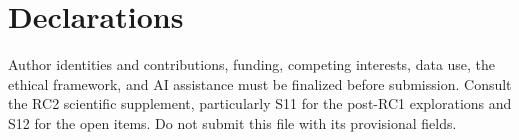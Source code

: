 \documentclass{IOS-Book-Article}
\begin{document}
\begin{frontmatter}
\title{\PaperTitle}
\author{\PaperAuthors}
\address{\PaperAffiliation}
\begin{abstract}

\end{abstract}
\begin{keyword}
\PaperKeywords
\end{keyword}
\end{frontmatter}

\section*{Declarations}
Author identities and contributions, funding, competing interests, data use, the ethical framework, and AI assistance must be finalized before submission. Consult the RC2 scientific supplement, particularly S11 for the post-RC1 explorations and S12 for the open items. Do not submit this file with its provisional fields.


\end{document}
